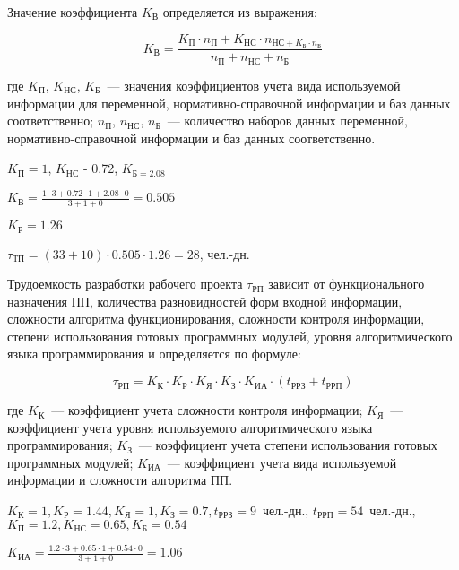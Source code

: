 Значение коэффициента $K_{\text{В}}$ определяется из выражения:

\begin{equation}
K_{\text{В}} = \frac{K_{\text{П}} \cdot n_{\text{П}} + K_{\text{НС}} \cdot n_{\text{НС} + K_{\text{Б}} \cdot n_{\text{Б}}}}{n_{\text{П}} + n_{\text{НС}} + n_{\text{Б}}}
\end{equation}

где  $K_{\text{П}}$, $K_{\text{НС}}$, $K_{\text{Б}}$~--- значения коэффициентов учета вида используемой информации для переменной, нормативно-справочной информации и баз данных соответственно; $n_{\text{П}}$, $n_{\text{НС}}$, $n_{\text{Б}}$~--- количество наборов данных переменной, нормативно-справочной информации и баз данных соответственно.

$K_{\text{П}} = 1$, $K_{\text{НС}}$ - 0.72, $K_{\text{Б} = 2.08}$

$K_{\text{В}} = \frac{1 \cdot 3 + 0.72 \cdot 1 + 2.08 \cdot 0}{3 + 1 + 0} = 0.505$

$K_{\text{Р}} = 1.26$

$\tau_{\text{ТП}} = (33 + 10) \cdot 0.505 \cdot 1.26 = 28$, чел.-дн.

Трудоемкость разработки рабочего проекта $\tau_{\text{РП}}$ зависит от функционального назначения ПП, количества разновидностей форм входной информации, сложности алгоритма функционирования, сложности контроля информации, степени использования готовых программных модулей, уровня алгоритмического языка программирования и определяется по формуле:

\begin{equation}
\tau_{\text{РП}} = K_{\text{К}} \cdot K_{\text{Р}} \cdot K_{\text{Я}} \cdot K_{\text{З}} \cdot K_{\text{ИА}} \cdot (t_{\text{РРЗ}} + t_{\text{РРП}})
\label{F:tauRP}
\end{equation}

где $K_{\text{К}}$~--- коэффициент учета сложности контроля информации; $K_{\text{Я}}$~--- коэффициент учета уровня используемого алгоритмического языка программирования; $K_{\text{З}}$~--- коэффициент учета степени использования готовых программных модулей; $K_{\text{ИА}}$~--- коэффициент учета вида используемой информации и сложности алгоритма ПП.

$K_{\text{К}} = 1, K_{\text{Р}} = 1.44, K_{\text{Я}} = 1, K_{\text{З}} = 0.7, t_{\text{РРЗ}} = 9$~чел.-дн., $t_{\text{РРП}} = 54$~чел.-дн., $K_{\text{П}} = 1.2, K_{\text{НС}} = 0.65, K_{\text{Б}} = 0.54$

$K_{\text{ИА}} = \frac{1.2 \cdot 3 + 0.65 \cdot 1 + 0.54 \cdot 0}{3 + 1 + 0} = 1.06$

